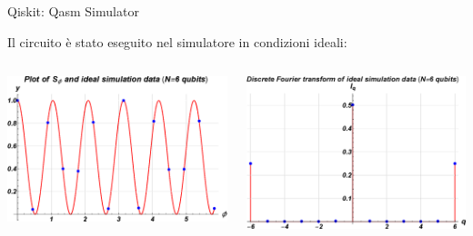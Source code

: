 \documentclass{beamer}
\renewcommand{\'}[0]{\`}
\begin{document}
	\begin{frame}{Qiskit: Qasm Simulator}
	
	Il circuito è stato eseguito nel simulatore in \alert{condizioni ideali}: 
	\vspace{0.5cm}
		
	\begin{columns}
	
	\centering \includegraphics[width=1\textwidth]{./image/6S.eps} 	

	\centering \includegraphics[width=1\textwidth]{./image/6I.eps}  

	\end{columns}
	
		
	\end{frame}
	
\end{document}
